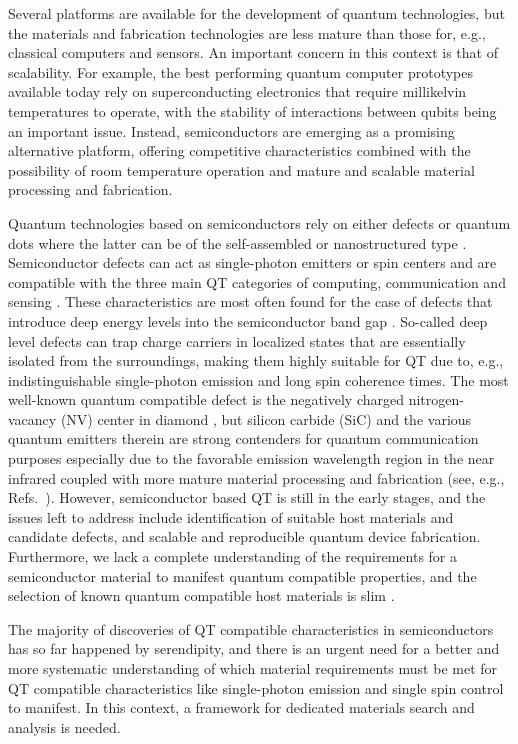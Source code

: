 \documentclass[superscriptaddress,unsortedaddress,
 amsmath,amssymb,
 aps,
]{revtex4-2}
\begin{document}
Several platforms are available for the development of quantum technologies, but the materials and fabrication technologies are less mature than those for, e.g., classical computers and sensors. 
An important concern in this context is that of scalability. 
For example, the best performing quantum computer prototypes available today rely on superconducting electronics that require millikelvin temperatures to operate, with the stability of interactions between qubits being an important issue. Instead, semiconductors are emerging as a promising alternative platform, offering competitive characteristics combined with the possibility of room temperature operation and mature and scalable material processing and fabrication.  

Quantum technologies based on semiconductors rely on either defects or quantum dots where the latter can be of the self-assembled or nanostructured type \cite{Aharonovich_2016}. 
Semiconductor defects can act as single-photon emitters or spin centers and are compatible with the three main QT categories of computing, communication and sensing \cite{Awschalom_2018}. 
These characteristics are most often found for the case of defects that introduce deep energy levels into the semiconductor band gap \cite{Weber2010}. So-called deep level defects can trap charge carriers in localized states that are essentially isolated from the surroundings, making them highly suitable for QT due to, e.g., 
indistinguishable  
single-photon emission and long spin coherence times. 
The most well-known quantum compatible defect is the negatively charged nitrogen-vacancy (NV) center in diamond \cite{Doherty_2013}, but silicon carbide (SiC) and the various quantum emitters therein are strong contenders for quantum communication purposes especially due to the favorable emission wavelength region in the near infrared coupled with more mature material processing and fabrication (see, e.g., Refs.~\cite{Castelletto_2015,Son2020,Bathen2021}). 
However, semiconductor based QT is still in the early stages, and the issues left to address include identification of suitable host materials and candidate defects, and scalable and reproducible quantum device fabrication. 
Furthermore, we lack a complete understanding of the requirements for a semiconductor material to manifest quantum compatible properties,  
and the selection of known quantum compatible host materials is slim \cite{Atatuere2018,Zhang2020}. 

The majority of discoveries of QT compatible characteristics in semiconductors has so far happened by serendipity, and there is an urgent need for a better and more systematic understanding of which material requirements must be met for QT compatible characteristics like single-photon emission and single spin control to manifest. In this context, a framework for dedicated materials search and analysis is needed. 
\end{document}
